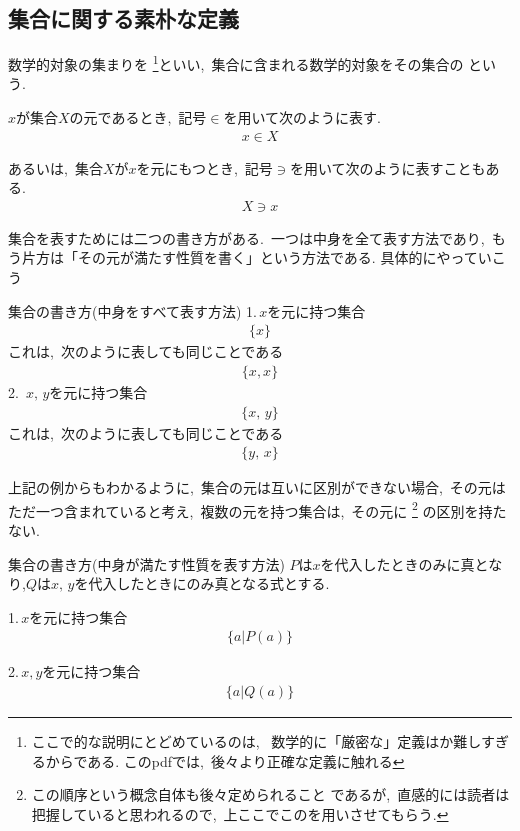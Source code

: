 \documentclass[hyperref,a4paper,12pt]{kininaruki}
\begin{document}
\subsection{集合に関する素朴な定義}
数学的対象の集まりを
\footnote{ここで的な説明にとどめているのは,%
\, 数学的に「厳密な」定義はか難しすぎるからである.
このpdfでは,\, 後々より正確な定義に触れる}といい,\, 
集合に含まれる数学的対象をその集合の
という.
\begin{shadebox}
    $x$が集合$X$の元であるとき,\, 記号$\in$を用いて次のように表す.
    \begin{align}
        x\in X
    \end{align}
    \begin{boxnote}
    あるいは,\, 集合$X$が$x$を元にもつとき,\, 記号$\ni$を用いて次のように表すこともある.
    \begin{align}
        X\ni x
    \end{align}
    \end{boxnote}
\end{shadebox}
集合を表すためには二つの書き方がある.\, 一つは中身を全て表す方法であり,\, %
もう片方は「その元が満たす性質を書く」という方法である.
具体的にやっていこう
\emptyline
\begin{itembox}[l]{集合の書き方(中身をすべて表す方法)}
    1.\,$x$を元に持つ集合
    \begin{align}
        \{x\}
    \end{align}
    これは,\, 次のように表しても同じことである
    \begin{align}
        \{x,x\}
    \end{align}
    2.\, $x,\, y$を元に持つ集合
    \begin{align}
        \{x,\, y\}
    \end{align}
    これは,\, 次のように表しても同じことである
    \begin{align}
        \{y,\, x\}
    \end{align}
\end{itembox}
\newpage
上記の例からもわかるように,\, 集合の元は互いに区別ができない場合,\, その元はただ一つ含まれていると考え,\,
複数の元を持つ集合は,\, その元に
\footnote{この順序という概念自体も後々定められること
であるが,\, 直感的には読者は把握していると思われるので,\, 
上ここでこのを用いさせてもらう.}
の区別を持たない.
\begin{itembox}[l]{集合の書き方(中身が満たす性質を表す方法)}
    $P$は$x$を代入したときのみに真となり,$Q$は$x,\, y$を代入したときにのみ真となる式とする.


    1.\,$x$を元に持つ集合
    \begin{align}
        \{a|P(a)\}
    \end{align}

    2.\,$x,y$を元に持つ集合
    \begin{align}
        \{a|Q(a)\}
    \end{align}
\end{itembox}
\end{document}
